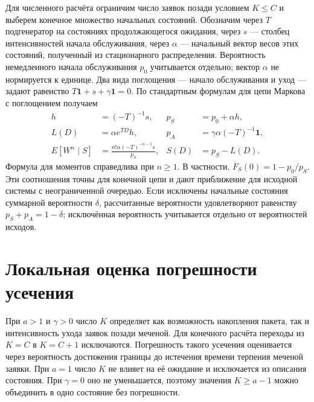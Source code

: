 Для численного расчёта ограничим число заявок позади условием $K\leq C$ и выберем конечное множество начальных состояний. Обозначим через $T$ подгенератор на состояниях продолжающегося ожидания, через $s$ --- столбец интенсивностей начала обслуживания, через $\alpha$ --- начальный вектор весов этих состояний, полученный из стационарного распределения. Вероятность немедленного начала обслуживания $p_0$ учитывается отдельно; вектор $\alpha$ не нормируется к единице. Два вида поглощения --- начало обслуживания и уход --- задают равенство $T\mathbf1+s+\gamma\mathbf1=0$. По стандартным формулам для цепи Маркова с поглощением получаем
\begin{align}
 h&=(-T)^{-1}s,& p_S&=p_0+\alpha h,\\
 L(D)&=\alpha e^{TD}h,& p_A&=\gamma\alpha(-T)^{-1}\mathbf1,\label{eq:ph}\\
 E[W^n\mid S]&=\frac{n!\alpha(-T)^{-n-1}s}{p_S},&
 S(D)&=p_S-L(D).
\end{align}
Формула для моментов справедлива при $n\geq1$. В частности, $\overline F_S(0)=1-p_0/p_S$. Эти соотношения точны для конечной цепи и дают приближение для исходной системы с неограниченной очередью. Если исключены начальные состояния суммарной вероятности $\delta$, рассчитанные вероятности удовлетворяют равенству $p_S+p_A=1-\delta$; исключённая вероятность учитывается отдельно от вероятностей исходов.

\section*{Локальная оценка погрешности усечения}

При $a>1$ и $\gamma>0$ число $K$ определяет как возможность накопления пакета, так и интенсивность ухода заявок позади меченой. Для конечного расчёта переходы из $K=C$ в $K=C+1$ исключаются. Погрешность такого усечения оценивается через вероятность достижения границы до истечения времени терпения меченой заявки. При $a=1$ число $K$ не влияет на её ожидание и исключается из описания состояния. При $\gamma=0$ оно не уменьшается, поэтому значения $K\geq a-1$ можно объединить в одно состояние без погрешности.

